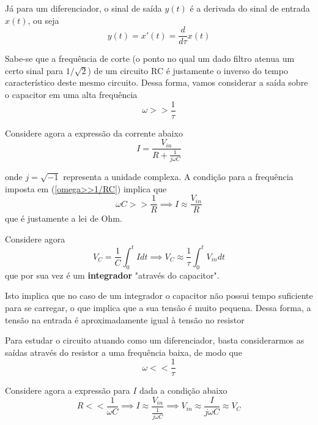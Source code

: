 \documentclass[letterpaper, 12pt]{article}
\begin{document}
Já para um diferenciador, o sinal de saída $y(t)$ é a derivada do sinal de entrada $x(t)$, ou seja
\begin{equation}\label{Diferenciador}
    y(t)=x'(t)=\frac{d}{d\tau}x(t)
\end{equation}

Sabe-se que a frequência de corte (o ponto no qual um dado filtro atenua um certo sinal para $1/\sqrt{2}$) de um circuito RC é justamente o inverso do tempo característico deste mesmo circuito. Dessa forma, vamos considerar a saída sobre o capacitor em uma alta frequência
\begin{equation}\label{omega - Integrador}
    \omega>>\frac{1}{\tau}
\end{equation}

Considere agora a expressão da corrente abaixo
\begin{equation}\label{I - integrador}
    I=\frac{V_{in}}{R+\frac{1}{j\omega C}}
\end{equation}

onde $j=\sqrt{-1}$ representa a unidade complexa. A condição para a frequência imposta em (\ref{omega>>1/RC}) implica que
\begin{equation}
    \omega C>>\frac{1}{R}\implies I\approx\frac{V_{in}}{R}
\end{equation}
que é justamente a lei de Ohm.

Considere agora
\begin{equation}\label{Integrador}
    V_{C}=\frac{1}{C}\int_{0}^{t}Idt\implies V_{C}\approx\frac{1}{\tau}\int_{0}^{t}V_{in}dt
\end{equation}
que por sua vez é um {\bf integrador} "através do capacitor".

Isto implica que no caso de um integrador o capacitor não possui tempo suficiente para se carregar, o que implica que a sua tensão é muito pequena. Dessa forma, a tensão na entrada é aproximadamente igual à tensão no resistor

Para estudar o circuito atuando como um diferenciador, basta considerarmos as saídas através do resistor a uma frequência baixa, de modo que
\begin{equation}\label{omega - Diferenciador}
    \omega<<\frac{1}{\tau}
\end{equation}

Considere agora a expressão para $I$ dada a condição abaixo
\begin{equation*}
    R<<\frac{1}{\omega C}\implies I\approx\frac{V_{in}}{\frac{1}{j\omega C}}\implies V_{in}\approx\frac{I}{j\omega C}\approx V_{C}
\end{equation*}
\end{document}

